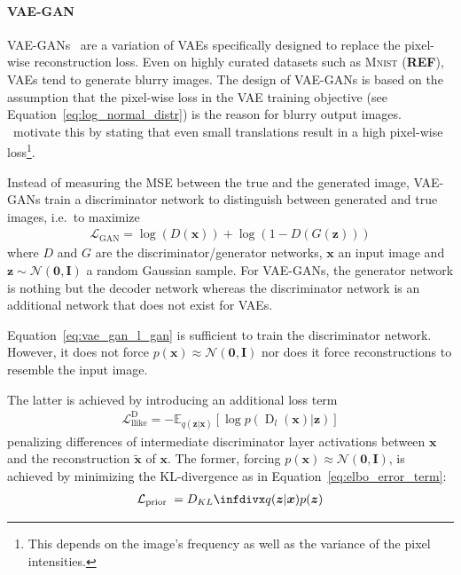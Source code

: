 \paragraph{\ac{VAE}-\ac{GAN}}
\ac{VAE}-\acp{GAN}~\citep{larsen2015autoencoding} are a variation of \acp{VAE} specifically designed to replace the pixel-wise reconstruction loss.
Even on highly curated datasets such as \textsc{Mnist} (\textbf{REF}), \acp{VAE} tend to generate blurry images.
The design of \ac{VAE}-\acp{GAN} is based on the assumption that the pixel-wise loss in the \ac{VAE} training objective (see Equation~\ref{eq:log_normal_distr}) is the reason for blurry output images.
\citet{larsen2015autoencoding}~motivate this by stating that even small translations result in a high pixel-wise loss\footnote{This depends on the image's frequency as well as the variance of the pixel intensities.}.

Instead of measuring the \ac{MSE} between the true and the generated image, \ac{VAE}-\acp{GAN} train a discriminator network to distinguish between generated and true images, i.e.~to maximize
\begin{align}
    \mathcal{L}_{\mathrm{GAN}}=\log (D(\bm{x}))+\log (1-D(G(\bm{z}))) \label{eq:vae_gan_l_gan}
\end{align}
where $D$ and $G$ are the discriminator/generator networks, $\bm{x}$ an input image and $\bm{z}\sim \mathcal{N}(\bm{0},\bm{I})$ a random Gaussian sample.
For \ac{VAE}-\acp{GAN}, the generator network is nothing but the decoder network whereas the discriminator network is an additional network that does not exist for \acp{VAE}.

Equation~\ref{eq:vae_gan_l_gan} is sufficient to train the discriminator network.
However, it does not force $p(\bm{x}) \approx \mathcal{N}(\bm{0},\bm{I})$ nor does it force reconstructions to resemble the input image.

The latter is achieved by introducing an additional loss term
\begin{align}
    \mathcal{L}_{\text {llike}}^{\text {D}}=-\mathbb{E}_{q(\bm{z} | \bm{x})}\left[\log p\left(\operatorname{D}_{l}(\bm{x}) | \bm{z}\right)\right]
\end{align}
penalizing differences of intermediate discriminator layer activations between $\bm{x}$ and the reconstruction $\tilde{\bm{x}}$ of $\bm{x}$.
The former, forcing $p(\bm{x}) \approx \mathcal{N}(\bm{0},\bm{I})$, is achieved by minimizing the \ac{KL}-divergence as in Equation~\ref{eq:elbo_error_term}:
\begin{align}
    \mathcal{L}_{\text {prior }}=\kldiv{q(\boldsymbol{z} | \boldsymbol{x})}{p(\boldsymbol{z})}
\end{align}

